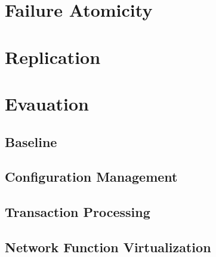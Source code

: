 \documentclass[twocolumn]{article}
\begin{document}
\section{Failure Atomicity}

\section{Replication}

\section{Evauation}

\subsection{Baseline}

\subsection{Configuration Management}

\subsection{Transaction Processing}

\subsection{Network Function Virtualization}
\end{document}
